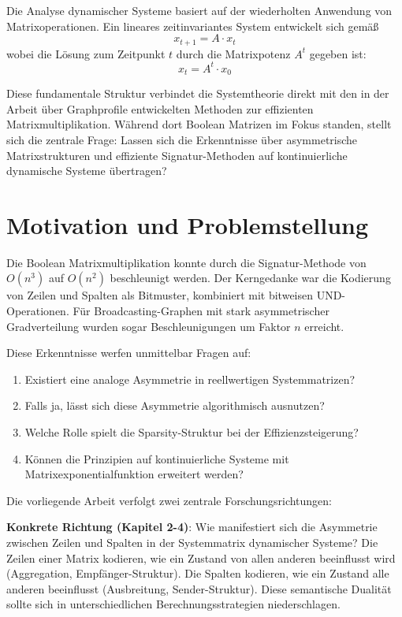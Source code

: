 \documentclass[a4paper,12pt]{report}
\theoremstyle{definition}
\begin{document}
	Die Analyse dynamischer Systeme basiert auf der wiederholten Anwendung von Matrixoperationen. Ein lineares zeitinvariantes System entwickelt sich gemäß
	\[
	x_{t+1} = A \cdot x_t
	\]
	wobei die Lösung zum Zeitpunkt $t$ durch die Matrixpotenz $A^t$ gegeben ist:
	\[
	x_t = A^t \cdot x_0
	\]
	
	Diese fundamentale Struktur verbindet die Systemtheorie direkt mit den in der Arbeit über Graphprofile entwickelten Methoden zur effizienten Matrixmultiplikation. Während dort Boolean Matrizen im Fokus standen, stellt sich die zentrale Frage: Lassen sich die Erkenntnisse über asymmetrische Matrixstrukturen und effiziente Signatur-Methoden auf kontinuierliche dynamische Systeme übertragen?
	
	\section{Motivation und Problemstellung}
	
	Die Boolean Matrixmultiplikation konnte durch die Signatur-Methode von $O(n^3)$ auf $O(n^2)$ beschleunigt werden. Der Kerngedanke war die Kodierung von Zeilen und Spalten als Bitmuster, kombiniert mit bitweisen UND-Operationen. Für Broadcasting-Graphen mit stark asymmetrischer Gradverteilung wurden sogar Beschleunigungen um Faktor $n$ erreicht.
	
	Diese Erkenntnisse werfen unmittelbar Fragen auf:
	
	\begin{enumerate}
		\item Existiert eine analoge Asymmetrie in reellwertigen Systemmatrizen?
		\item Falls ja, lässt sich diese Asymmetrie algorithmisch ausnutzen?
		\item Welche Rolle spielt die Sparsity-Struktur bei der Effizienzsteigerung?
		\item Können die Prinzipien auf kontinuierliche Systeme mit Matrixexponentialfunktion erweitert werden?
	\end{enumerate}
	
	Die vorliegende Arbeit verfolgt zwei zentrale Forschungsrichtungen:
	
	\textbf{Konkrete Richtung (Kapitel 2-4)}: Wie manifestiert sich die Asymmetrie zwischen Zeilen und Spalten in der Systemmatrix dynamischer Systeme? Die Zeilen einer Matrix kodieren, wie ein Zustand von allen anderen beeinflusst wird (Aggregation, Empfänger-Struktur). Die Spalten kodieren, wie ein Zustand alle anderen beeinflusst (Ausbreitung, Sender-Struktur). Diese semantische Dualität sollte sich in unterschiedlichen Berechnungsstrategien niederschlagen.
	
\end{document}
